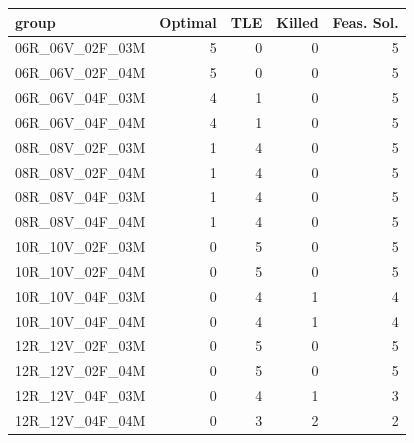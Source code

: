 
\begin{tabular}{lrrrr}
\toprule
group & Optimal & TLE & Killed & Feas. Sol.\\
\midrule
06R\_06V\_02F\_03M & 5 & 0 & 0 & 5\\
06R\_06V\_02F\_04M & 5 & 0 & 0 & 5\\
06R\_06V\_04F\_03M & 4 & 1 & 0 & 5\\
06R\_06V\_04F\_04M & 4 & 1 & 0 & 5\\
08R\_08V\_02F\_03M & 1 & 4 & 0 & 5\\
\addlinespace
08R\_08V\_02F\_04M & 1 & 4 & 0 & 5\\
08R\_08V\_04F\_03M & 1 & 4 & 0 & 5\\
08R\_08V\_04F\_04M & 1 & 4 & 0 & 5\\
10R\_10V\_02F\_03M & 0 & 5 & 0 & 5\\
10R\_10V\_02F\_04M & 0 & 5 & 0 & 5\\
\addlinespace
10R\_10V\_04F\_03M & 0 & 4 & 1 & 4\\
10R\_10V\_04F\_04M & 0 & 4 & 1 & 4\\
12R\_12V\_02F\_03M & 0 & 5 & 0 & 5\\
12R\_12V\_02F\_04M & 0 & 5 & 0 & 5\\
12R\_12V\_04F\_03M & 0 & 4 & 1 & 3\\
\addlinespace
12R\_12V\_04F\_04M & 0 & 3 & 2 & 2\\
\bottomrule
\end{tabular}
